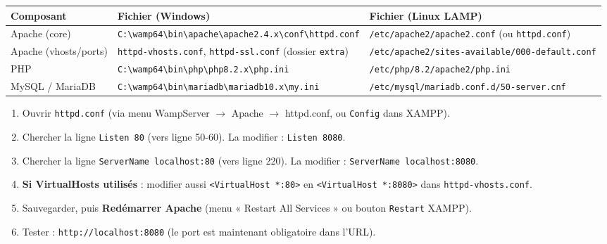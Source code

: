 \documentclass[11pt]{article}
\begin{document}
\begin{propriete}
\begin{center}
\begin{tabular}{|l|l|l|}
\hline
\rowcolor{popblueL} \textbf{Composant} & \textbf{Fichier (Windows)} & \textbf{Fichier (Linux LAMP)} \\
\hline
Apache (core) & \texttt{C:\textbackslash wamp64\textbackslash bin\textbackslash apache\textbackslash apache2.4.x\textbackslash conf\textbackslash httpd.conf} & \texttt{/etc/apache2/apache2.conf} (ou \texttt{httpd.conf}) \\
Apache (vhosts/ports) & \texttt{httpd-vhosts.conf}, \texttt{httpd-ssl.conf} (dossier \texttt{extra}) & \texttt{/etc/apache2/sites-available/000-default.conf} \\
PHP & \texttt{C:\textbackslash wamp64\textbackslash bin\textbackslash php\textbackslash php8.2.x\textbackslash php.ini} & \texttt{/etc/php/8.2/apache2/php.ini} \\
MySQL / MariaDB & \texttt{C:\textbackslash wamp64\textbackslash bin\textbackslash mariadb\textbackslash mariadb10.x\textbackslash my.ini} & \texttt{/etc/mysql/mariadb.conf.d/50-server.cnf} \\
\hline
\end{tabular}
\end{center}
\end{propriete}

\begin{methode}
\begin{enumerate}
\item Ouvrir \texttt{httpd.conf} (via menu WampServer $\rightarrow$ Apache $\rightarrow$ httpd.conf, ou \texttt{Config} dans XAMPP).
\item Chercher la ligne \texttt{Listen 80} (vers ligne 50-60). La modifier : \texttt{Listen 8080}.
\item Chercher la ligne \texttt{ServerName localhost:80} (vers ligne 220). La modifier : \texttt{ServerName localhost:8080}.
\item \textbf{Si VirtualHosts utilisés} : modifier aussi \texttt{<VirtualHost *:80>} en \texttt{<VirtualHost *:8080>} dans \texttt{httpd-vhosts.conf}.
\item Sauvegarder, puis \textbf{Redémarrer Apache} (menu « Restart All Services » ou bouton \texttt{Restart} XAMPP).
\item Tester : \texttt{http://localhost:8080} (le port est maintenant obligatoire dans l'URL).
\end{enumerate}
\end{methode}
\end{document}
